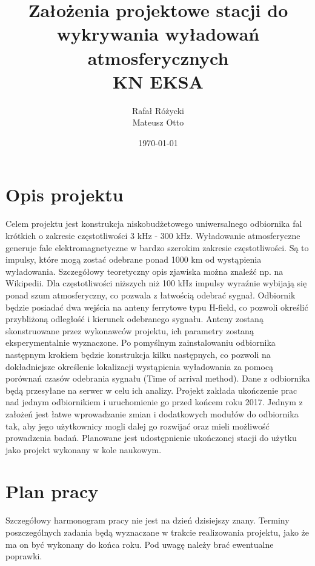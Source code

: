 \documentclass[12pt]{article}
\title{\textbf{Założenia projektowe stacji do wykrywania wyładowań atmosferycznych}\\KN EKSA}
\author{Rafał Różycki \\ Mateusz Otto}
\date{\today}
\begin{document}
\maketitle
\newpage

\section{Opis projektu}
Celem projektu jest konstrukcja niskobudżetowego uniwersalnego odbiornika fal krótkich o zakresie częstotliwości 3 kHz - 300 kHz. Wyładowanie atmosferyczne generuje fale elektromagnetyczne w bardzo szerokim zakresie częstotliwości. Są to impulsy, które mogą zostać odebrane ponad 1000 km od wystąpienia wyładowania. Szczegółowy teoretyczny opis zjawiska można znaleźć np. na Wikipedii. Dla częstotliwości niższych niż 100 kHz impulsy wyraźnie wybijają się ponad szum atmosferyczny, co pozwala z łatwością odebrać sygnał. Odbiornik będzie posiadać dwa wejścia na anteny ferrytowe typu H-field, co pozwoli określić przybliżoną odległość i kierunek odebranego sygnału. Anteny zostaną skonstruowane przez wykonawców projektu, ich parametry zostaną eksperymentalnie wyznaczone. Po pomyślnym zainstalowaniu odbiornika następnym krokiem będzie konstrukcja kilku następnych, co pozwoli na dokładniejsze określenie lokalizacji wystąpienia wyładowania za pomocą porównań czasów odebrania sygnału (Time of arrival method). Dane z odbiornika będą przesyłane na serwer w celu ich analizy. Projekt zakłada ukończenie prac nad jednym odbiornikiem i uruchomienie go przed końcem roku 2017. Jednym z założeń jest łatwe wprowadzanie zmian i dodatkowych modułów do odbiornika tak, aby jego użytkownicy mogli dalej go rozwijać oraz mieli możliwość prowadzenia badań. Planowane jest udostępnienie ukończonej stacji do użytku jako projekt wykonany w kole naukowym.

\section{Plan pracy}
Szczegółowy harmonogram pracy nie jest na dzień dzisiejszy znany. Terminy poszczególnych zadania będą wyznaczane w trakcie realizowania projektu, jako że ma on być wykonany do końca roku. Pod uwagę należy brać ewentualne poprawki.
\end{document}
